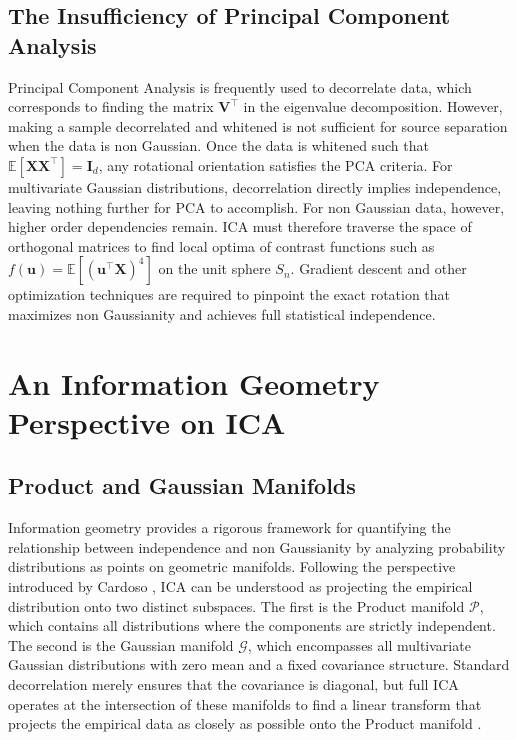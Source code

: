\documentclass[12pt,a4paper,twoside,openany]{book}
\begin{document}
\subsection{The Insufficiency of Principal Component Analysis}
Principal Component Analysis is frequently used to decorrelate data, which corresponds to finding the matrix $\mathbf{V}^\top$ in the eigenvalue decomposition. 
However, making a sample decorrelated and whitened is not sufficient for source separation when the data is non Gaussian. 
Once the data is whitened such that $\mathbb{E}[\mathbf{X}\mathbf{X}^\top] = \mathbf{I}_d$, any rotational orientation satisfies the PCA criteria. 
For multivariate Gaussian distributions, decorrelation directly implies independence, leaving nothing further for PCA to accomplish. For non Gaussian data, however, 
higher order dependencies remain. ICA must therefore traverse the space of orthogonal matrices to find local optima of contrast functions such as $f(\mathbf{u}) = \mathbb{E}[(\mathbf{u}^\top \mathbf{X})^4]$ on the unit sphere $S_n$. 
Gradient descent and other optimization techniques are required to pinpoint the exact rotation that maximizes non Gaussianity and achieves full statistical independence.

\section{An Information Geometry Perspective on ICA}

\subsection{Product and Gaussian Manifolds}
Information geometry provides a rigorous framework for quantifying the relationship between independence and non Gaussianity by analyzing probability distributions as points on geometric manifolds. 
Following the perspective introduced by Cardoso \citeyear{cardoso2022}, ICA can be understood as projecting the empirical distribution onto two distinct subspaces. The first is the Product manifold $\mathcal{P}$, 
which contains all distributions where the components are strictly independent. The second is the Gaussian manifold $\mathcal{G}$, which encompasses all multivariate Gaussian distributions with zero mean and a fixed covariance structure. 
Standard decorrelation merely ensures that the covariance is diagonal, but full ICA operates at the intersection of these manifolds to find a linear transform that projects the empirical data as closely as possible onto the Product manifold \cite{cardoso2022}.
\end{document}
